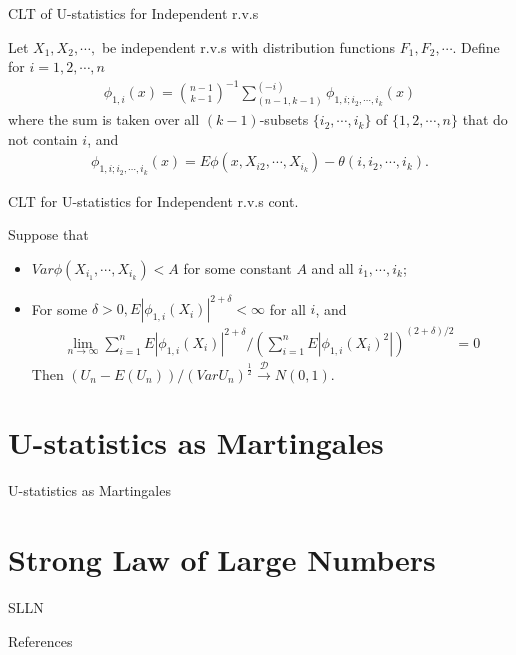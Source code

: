 \documentclass{beamer}
\theoremstyle{definition}
\numberwithin{Def}{section}
\begin{document}
\begin{frame}{CLT of U-statistics for Independent r.v.s}
\begin{theorem}
    Let $X_1, X_2, \cdots,$ be independent r.v.s with distribution functions $F_1, F_2, \cdots$. Define for $i = 1,2, \cdots, n$
    \begin{align}
        \phi_{1,i} (x) = {n-1 \choose k-1}^{-1} \sum_{(n-1, k-1)}^{(-i)} \phi_{1, i; i_2, \cdots, i_k}(x)
    \end{align}
    where the sum is taken over all $(k-1)$-subsets $\{i_2, \cdots, i_k\}$ of $\{1,2, \cdots, n\}$ that do not contain $i$, and 
    \begin{align}
        \phi_{1, i; i_2, \cdots, i_k}(x) = E \phi(x, X_{i2}, \cdots, X_{i_k}) - \theta(i, i_2, \cdots, i_k).
    \end{align}
    \end{theorem}
    \end{frame}
    
    \begin{frame}{CLT for U-statistics for Independent r.v.s cont.}
    \begin{theorem}
    Suppose that 
    \begin{itemize}
        \item $Var \phi(X_{i_1}, \cdots, X_{i_k} ) < A$ for some constant $A$ and all $i_1, \cdots, i_k$;
        \item For some $\delta > 0, E|\phi_{1, i} (X_i) |^{2 + \delta} < \infty$ for all $i$, and 
        \begin{align}
            \lim_{n \rightarrow \infty} \sum_{i =1}^{n} E|\phi_{1, i} (X_i) |^{2 + \delta} \Big/ (\sum_{i =1}^{n} E|\phi_{1, i} (X_i)^2 |) ^{(2 + \delta)/2} = 0
        \end{align}
       Then $(U_n - E(U_n)) / (Var U_n)^{\frac{1}{2}} \xrightarrow{\mathcal{D}} N(0,1).$ 
    \end{itemize}
    \end{theorem}
  \end{frame}

\section{U-statistics as Martingales}
\begin{frame}{U-statistics as Martingales}
\end{frame}
\section{Strong Law of Large Numbers}
\begin{frame}{SLLN}
\end{frame}
\begin{frame}{References}
\printbibliography
\end{frame}
\end{document}

